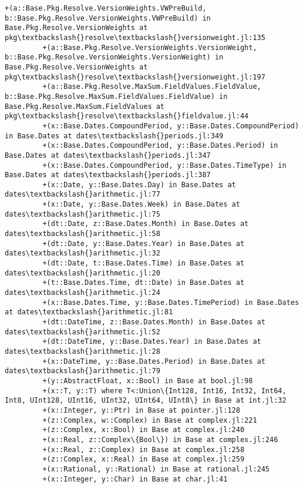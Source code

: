 \documentclass[11pt]{article}
\begin{document}
\begin{Verbatim}[commandchars=\\\{\}]
         +(a::Base.Pkg.Resolve.VersionWeights.VWPreBuild, b::Base.Pkg.Resolve.VersionWeights.VWPreBuild) in Base.Pkg.Resolve.VersionWeights at pkg\textbackslash{}resolve\textbackslash{}versionweight.jl:135
         +(a::Base.Pkg.Resolve.VersionWeights.VersionWeight, b::Base.Pkg.Resolve.VersionWeights.VersionWeight) in Base.Pkg.Resolve.VersionWeights at pkg\textbackslash{}resolve\textbackslash{}versionweight.jl:197
         +(a::Base.Pkg.Resolve.MaxSum.FieldValues.FieldValue, b::Base.Pkg.Resolve.MaxSum.FieldValues.FieldValue) in Base.Pkg.Resolve.MaxSum.FieldValues at pkg\textbackslash{}resolve\textbackslash{}fieldvalue.jl:44
         +(x::Base.Dates.CompoundPeriod, y::Base.Dates.CompoundPeriod) in Base.Dates at dates\textbackslash{}periods.jl:349
         +(x::Base.Dates.CompoundPeriod, y::Base.Dates.Period) in Base.Dates at dates\textbackslash{}periods.jl:347
         +(x::Base.Dates.CompoundPeriod, y::Base.Dates.TimeType) in Base.Dates at dates\textbackslash{}periods.jl:387
         +(x::Date, y::Base.Dates.Day) in Base.Dates at dates\textbackslash{}arithmetic.jl:77
         +(x::Date, y::Base.Dates.Week) in Base.Dates at dates\textbackslash{}arithmetic.jl:75
         +(dt::Date, z::Base.Dates.Month) in Base.Dates at dates\textbackslash{}arithmetic.jl:58
         +(dt::Date, y::Base.Dates.Year) in Base.Dates at dates\textbackslash{}arithmetic.jl:32
         +(dt::Date, t::Base.Dates.Time) in Base.Dates at dates\textbackslash{}arithmetic.jl:20
         +(t::Base.Dates.Time, dt::Date) in Base.Dates at dates\textbackslash{}arithmetic.jl:24
         +(x::Base.Dates.Time, y::Base.Dates.TimePeriod) in Base.Dates at dates\textbackslash{}arithmetic.jl:81
         +(dt::DateTime, z::Base.Dates.Month) in Base.Dates at dates\textbackslash{}arithmetic.jl:52
         +(dt::DateTime, y::Base.Dates.Year) in Base.Dates at dates\textbackslash{}arithmetic.jl:28
         +(x::DateTime, y::Base.Dates.Period) in Base.Dates at dates\textbackslash{}arithmetic.jl:79
         +(y::AbstractFloat, x::Bool) in Base at bool.jl:98
         +(x::T, y::T) where T<:Union\{Int128, Int16, Int32, Int64, Int8, UInt128, UInt16, UInt32, UInt64, UInt8\} in Base at int.jl:32
         +(x::Integer, y::Ptr) in Base at pointer.jl:128
         +(z::Complex, w::Complex) in Base at complex.jl:221
         +(z::Complex, x::Bool) in Base at complex.jl:240
         +(x::Real, z::Complex\{Bool\}) in Base at complex.jl:246
         +(x::Real, z::Complex) in Base at complex.jl:258
         +(z::Complex, x::Real) in Base at complex.jl:259
         +(x::Rational, y::Rational) in Base at rational.jl:245
         +(x::Integer, y::Char) in Base at char.jl:41

\end{Verbatim}
\end{document}
